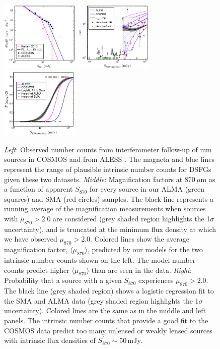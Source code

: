 \documentclass[iop]{emulateapj}
\begin{document}
\begin{figure}[!tbp] 
\includegraphics[width=0.335\textwidth]{../Figures/DifferentialNumberCounts.pdf}
\includegraphics[width=0.335\textwidth]{../Figures/s870_mu_z1p5.pdf}
\includegraphics[width=0.335\textwidth]{../Figures/Pmu_S870_z1p5.pdf}

\caption{ {\it Left}: Observed number counts from interferometer
follow-up of mm sources in COSMOS \citep[black circles;][]{Younger:2007fk,
Younger:2009lr, Miettinen:2015lr} and from ALESS \citep[pink
diamonds;][]{Karim:2013lr}.  The magneta and blue lines represent the range of
plausible intrinsic number counts for DSFGs given these two datasets.
{\it Middle}: Magnification factors at 870$\,\mu$m as a function of apparent
$S_{870}$ for every source in our ALMA (green squares) and SMA (red circles)
samples.  The black line represents a running average of the magnification
measurements when sources with $\mu_{870} > 2.0$ are considered (grey shaded
region highlights the 1$\sigma$ uncertainty), and is truncated at the minimum
flux density at which we have observed $\mu_{870} > 2.0$.  Colored lines show
the average magnification factor, $\langle\mu_{870}\rangle$, predicted by our
models for the two intrinsic number counts shown on the left.  The model
number counts predict higher $\langle\mu_{870}\rangle$ than are seen in
the data.  {\it Right}: Probability that a source with a given $S_{870}$
experiences $\mu_{870} > 2.0$.  The black line (grey shaded region) shows a
logistic regression fit to the SMA and ALMA data (grey shaded region highlights
the 1$\sigma$ uncertainty).  Colored lines are the same as in the middle and
left panels.  The intrinsic number counts that provide a good fit to the
COSMOS data predict too many unlensed or weakly lensed sources with intrinsic
flux densities of $S_{870}^\prime \sim 50\,$mJy.} \label{fig:lensstats}

\end{figure}
\end{document}
